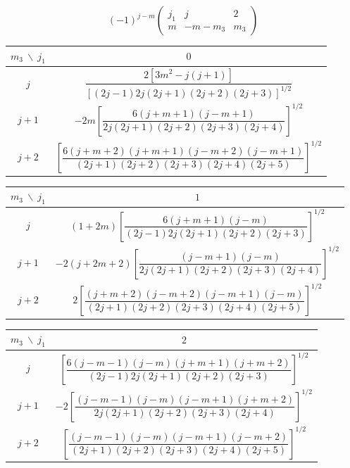 \begin{equation*}
  (-1)^{j-m}\left(\begin{array}{ccc}j_1&j&2\\m&-m-m_3&m_3\end{array}\right)
\end{equation*}
\begin{center}
\renewcommand{\arraystretch}{1.7}%
\begin{tabular}{c|c}
  $m_3\ \backslash\ j_1$ & $0$\\ \hline
  $j$ & $\dfrac{2\left[3m^2-j(j+1)\right]}{\left[(2j-1)2j(2j+1)(2j+2)(2j+3)\right]^{1/2}}$\\[10pt]
  $j+1$ & $-2m\left[\dfrac{6(j+m+1)(j-m+1)}{2j(2j+1)(2j+2)(2j+3)(2j+4)}\right]^{1/2}$\\[10pt]
  $j+2$ & $\left[\dfrac{6(j+m+2)(j+m+1)(j-m+2)(j-m+1)}
  {(2j+1)(2j+2)(2j+3)(2j+4)(2j+5)}\right]^{1/2}$\\[10pt]
\end{tabular}

\medskip

\begin{tabular}{c|c}
  $m_3\ \backslash\ j_1$ & $1$\\ \hline
  $j$ & $(1+2m)\left[\dfrac{6(j+m+1)(j-m)}
  {(2j-1)2j(2j+1)(2j+2)(2j+3)}\right]^{1/2}$\\[10pt]
  $j+1$ & $-2(j+2m+2)\left[\dfrac{(j-m+1)(j-m)}
  {2j(2j+1)(2j+2)(2j+3)(2j+4)}\right]^{1/2}$\\[10pt]
  $j+2$ & $2\left[\dfrac{(j+m+2)(j-m+2)(j-m+1)(j-m)}
  {(2j+1)(2j+2)(2j+3)(2j+4)(2j+5)}\right]^{1/2}$\\[10pt]
\end{tabular}

\medskip

\begin{tabular}{c|c}
  $m_3\ \backslash\ j_1$ & $2$\\ \hline
  $j$ & $\left[\dfrac{6(j-m-1)(j-m)(j+m+1)(j+m+2)}
  {(2j-1)2j(2j+1)(2j+2)(2j+3)}\right]^{1/2}$\\[10pt]
  $j+1$ & $-2\left[\dfrac{(j-m-1)(j-m)(j-m+1)(j+m+2)}
  {2j(2j+1)(2j+2)(2j+3)(2j+4)}\right]^{1/2}$\\[10pt]
  $j+2$ & $\left[\dfrac{(j-m-1)(j-m)(j-m+1)(j-m+2)}
  {(2j+1)(2j+2)(2j+3)(2j+4)(2j+5)}\right]^{1/2}$\\[10pt]
\end{tabular}
\end{center}

